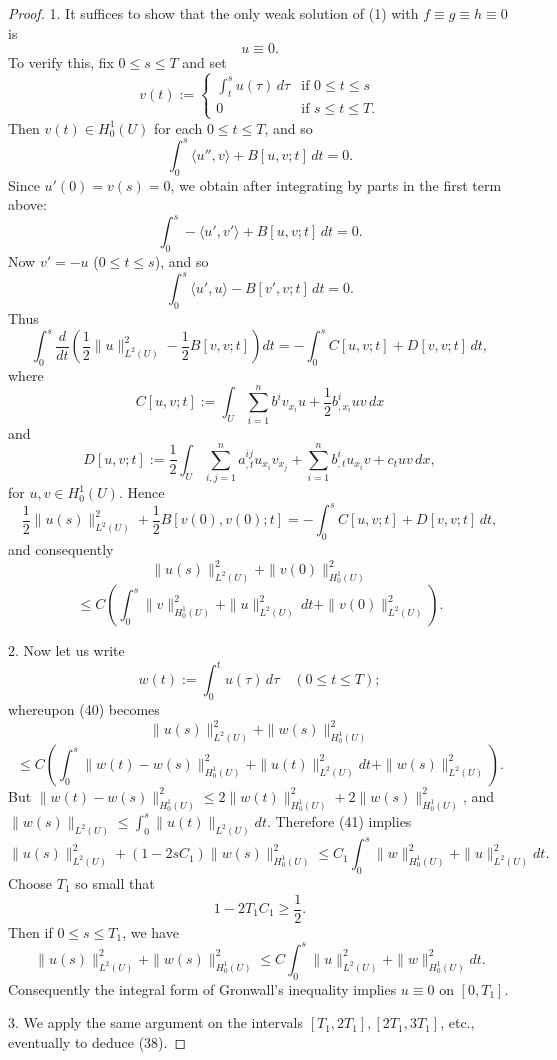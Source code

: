 \begin{proof}
1. It suffices to show that the only weak solution of (1) with $f \equiv g \equiv h \equiv 0$ is
\[
u \equiv 0. \tag{38}
\]
To verify this, fix $0 \le s \le T$ and set
\[
v(t) := \begin{cases} \int_t^s u(\tau) \, d\tau & \text{if } 0 \le t \le s \\ 0 & \text{if } s \le t \le T. \end{cases}
\]
Then $v(t) \in H_0^1(U)$ for each $0 \le t \le T$, and so
\[
\int_0^s \langle u'', v \rangle + B[u, v; t] \, dt = 0.
\]
Since $u'(0) = v(s) = 0$, we obtain after integrating by parts in the first term above:
\[
\int_0^s -\langle u', v' \rangle + B[u, v; t] \, dt = 0. \tag{39}
\]
Now $v' = -u$ ($0 \le t \le s$), and so
\[
\int_0^s \langle u', u \rangle - B[v', v; t] \, dt = 0.
\]
Thus
\[
\int_0^s \frac{d}{dt}\left(\frac{1}{2}\|u\|_{L^2(U)}^2 - \frac{1}{2}B[v, v; t]\right) dt = -\int_0^s C[u, v; t] + D[v, v; t] \, dt,
\]
where
\[
C[u, v; t] := \int_U \sum_{i=1}^n b^i v_{x_i} u + \frac{1}{2}b^i_{,x_i} uv \, dx
\]
and
\[
D[u, v; t] := \frac{1}{2}\int_U \sum_{i,j=1}^n a^{ij}_{,t} u_{x_i} v_{x_j} + \sum_{i=1}^n b^i_{,t} u_{x_i} v + c_t uv \, dx,
\]
for $u, v \in H_0^1(U)$. Hence
\[
\frac{1}{2}\|u(s)\|_{L^2(U)}^2 + \frac{1}{2}B[v(0), v(0); t] = -\int_0^s C[u, v; t] + D[v, v; t] \, dt,
\]
and consequently
\[
\|u(s)\|_{L^2(U)}^2 + \|v(0)\|_{H_0^1(U)}^2
\]
\[
\le C\left(\int_0^s \|v\|_{H_0^1(U)}^2 + \|u\|_{L^2(U)}^2 \, dt + \|v(0)\|_{L^2(U)}^2\right). \tag{40}
\]

2. Now let us write
\[
w(t) := \int_0^t u(\tau) \, d\tau \quad (0 \le t \le T);
\]
whereupon (40) becomes
\[
\|u(s)\|^2_{L^2(U)} + \|w(s)\|^2_{H^1_0(U)}
\]
\[
\leq C \left( \int_0^s \|w(t) - w(s)\|^2_{H^1_0(U)} + \|u(t)\|^2_{L^2(U)} dt + \|w(s)\|^2_{L^2(U)} \right). \tag{41}
\]
But $\|w(t)-w(s)\|^2_{H^1_0(U)} \leq 2\|w(t)\|^2_{H^1_0(U)}+2\|w(s)\|^2_{H^1_0(U)}$, and $\|w(s)\|_{L^2(U)} \leq \int_0^s \|u(t)\|_{L^2(U)} dt$. Therefore (41) implies
\[
\|u(s)\|^2_{L^2(U)} + (1 - 2sC_1)\|w(s)\|^2_{H^1_0(U)} \leq C_1 \int_0^s \|w\|^2_{H^1_0(U)} + \|u\|^2_{L^2(U)} dt.
\]
Choose $T_1$ so small that
\[
1 - 2T_1 C_1 \geq \frac{1}{2}.
\]
Then if $0 \leq s \leq T_1$, we have
\[
\|u(s)\|^2_{L^2(U)} + \|w(s)\|^2_{H^1_0(U)} \leq C \int_0^s \|u\|^2_{L^2(U)} + \|w\|^2_{H^1_0(U)} dt.
\]
Consequently the integral form of Gronwall's inequality implies $u \equiv 0$ on $[0, T_1]$.

3. We apply the same argument on the intervals $[T_1, 2T_1], [2T_1, 3T_1]$, etc., eventually to deduce (38).
\end{proof}

